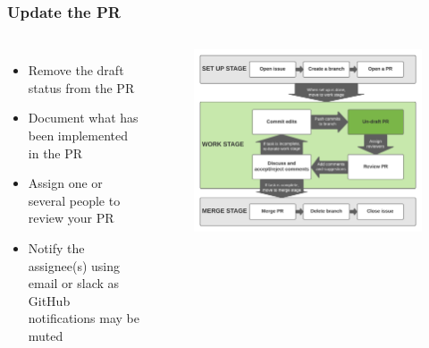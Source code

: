 \documentclass[aspectratio=169]{beamer} %
\begin{document}
\begin{frame}
	\frametitle{Update the PR}
	\begin{columns}[c]

		\begin{itemize}
			\setlength\itemsep{1em}
			\item Remove the draft status from the PR
			\item Document what has been implemented in the PR
			\item Assign one or several people to review your PR
			\item Notify the assignee(s) using email or slack as GitHub notifications may be muted
		\end{itemize}

		\vspace{-.75cm}
		\begin{figure}
			\centering
			\includegraphics[width=\textwidth]{./img/branch-pr-merge-cycle-S2-2.png}
		\end{figure}

	\end{columns}
\end{frame}
\end{document}
